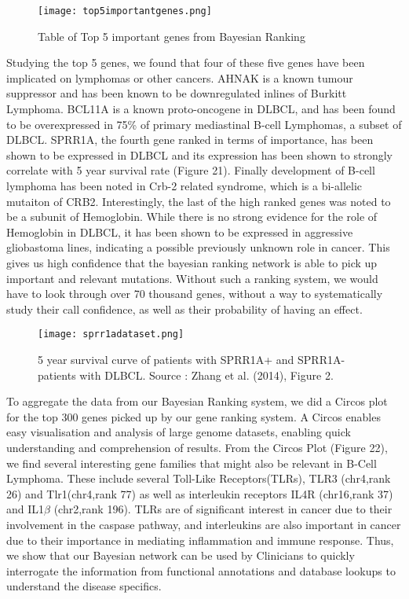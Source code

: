 \documentclass{article}
\begin{document}
\begin{figure}[H]
\caption{Table of Top 5 important genes from Bayesian Ranking}
\texttt{[image: top5importantgenes.png]}
\centering
\end{figure}

Studying the top 5 genes, we found that four of these five genes have been implicated on lymphomas or other cancers. AHNAK is a known tumour suppressor and has been known to be downregulated inlines of Burkitt Lymphoma. BCL11A is a known proto-oncogene in DLBCL, and has been found to be overexpressed in 75\% of primary mediastinal B-cell Lymphomas, a subset of DLBCL. SPRR1A, the fourth gene ranked in terms of importance, has been shown to be expressed in DLBCL and its expression has been shown to strongly correlate with 5 year survival rate (Figure 21). Finally development of B-cell lymphoma has been noted in Crb-2 related syndrome, which is a bi-allelic mutaiton of CRB2. Interestingly, the last of the high ranked genes was noted to be a subunit of Hemoglobin. While there is no strong evidence for the role of Hemoglobin in DLBCL, it has been shown to be expressed in aggressive gliobastoma lines, indicating a possible previously unknown role in cancer. This gives us high confidence that the bayesian ranking network is able to pick up important and relevant mutations. Without such a ranking system, we would have to look through over 70 thousand genes, without a way to systematically study their call confidence, as well as their probability of having an effect. 

\begin{figure}[H]
\centering
\texttt{[image: sprr1adataset.png]}
\caption{5 year survival curve of patients with SPRR1A+ and SPRR1A- patients with DLBCL. Source : Zhang et al. (2014), Figure 2.}
\end{figure}


To aggregate the data from our Bayesian Ranking system, we did a Circos plot for the top 300 genes picked up by our gene ranking system. A Circos enables easy visualisation and analysis of large genome datasets, enabling quick understanding and comprehension of results. From the Circos Plot (Figure 22), we find several interesting gene families that might also be relevant in B-Cell Lymphoma. These include several Toll-Like Receptors(TLRs), TLR3 (chr4,rank 26) and Tlr1(chr4,rank 77) as well as interleukin receptors IL4R (chr16,rank 37) and IL1$\beta$ (chr2,rank 196). TLRs are of significant interest in cancer due to their involvement in the caspase pathway, and interleukins are also important in cancer due to their importance in mediating inflammation and immune response. Thus, we show that our Bayesian network can be used by Clinicians to quickly interrogate the information from functional annotations and database lookups to understand the disease specifics. 
\end{document}
